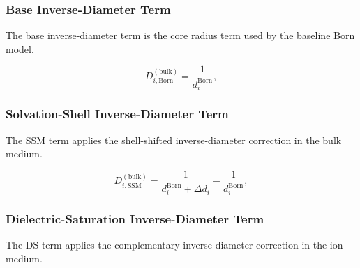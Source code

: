 \documentclass[12pt, letterpaper]{article}
\begin{document}
\subsubsection{Base Inverse-Diameter Term}

The base inverse-diameter term is the core radius term used by the baseline Born model.

\begin{equation}
D_{i,\mathrm{Born}}^{(\mathrm{bulk})}
=
\frac{1}{d_i^{\mathrm{Born}}},
\label{eq:D_born}
\end{equation}

\subsubsection{Solvation-Shell Inverse-Diameter Term}

The SSM term applies the shell-shifted inverse-diameter correction in the bulk medium.

\begin{equation}
D_{i,\mathrm{SSM}}^{(\mathrm{bulk})}
=
\frac{1}{d_i^{\mathrm{Born}}+\Delta d_i}
-
\frac{1}{d_i^{\mathrm{Born}}},
\label{eq:D_ssm}
\end{equation}

\subsubsection{Dielectric-Saturation Inverse-Diameter Term}

The DS term applies the complementary inverse-diameter correction in the ion medium.
\end{document}
